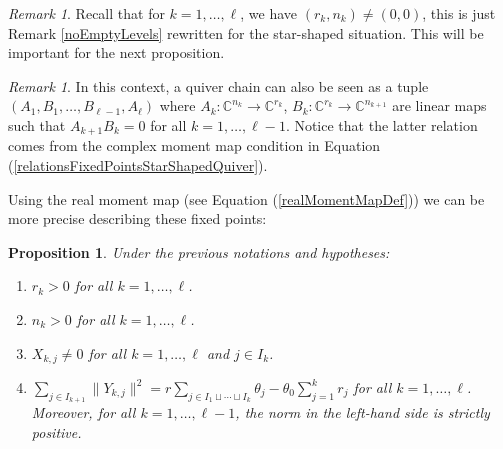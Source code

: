 \documentclass{amsart}
\theoremstyle{plain}
\newtheorem{proposition}[theorem]{Proposition}
\numberwithin{equation}{section}
\theoremstyle{definition}
\theoremstyle{remark}
\newtheorem{remark}[theorem]{Remark}
\begin{document}
	\begin{remark}
	Recall that for $k=1,\ldots,\ell$, we have $(r_k,n_k)\neq(0,0)$, this is just Remark \ref{noEmptyLevels} rewritten for the star-shaped situation. This will be important for the next proposition. 
	\end{remark}
	\begin{remark}\label{anotherPointOfViewStarShapedChains}
		In this context, a quiver chain can also be seen as a tuple $(A_1,B_1,\ldots ,B_{\ell-1},A_\ell)$ where $A_k:\mathbb{C}^{n_k}\to \mathbb{C}^{r_k}$, $B_{k}:\mathbb{C}^{r_{k}}\to \mathbb{C}^{n_{k+1}}$ are linear maps such that $A_{k+1}B_k=0$ for all $k=1,\ldots,\ell-1$. Notice that the latter relation comes from the complex moment map condition in Equation (\ref{relationsFixedPointsStarShapedQuiver}).
	\end{remark}
	Using the real moment map (see Equation (\ref{realMomentMapDef})) we can be more precise describing these fixed points:
	\begin{proposition}\label{propertiesFixedPointsStarShapedQuiver}
		Under the previous notations and hypotheses:
		\begin{enumerate}
			\item $r_k>0$ for all $k=1,\ldots,\ell$.
			\item $n_k>0$ for all $k=1,\ldots,\ell$.
			\item $X_{k,j}\neq 0$  for all $k=1,\ldots,\ell$ and $j\in I_k$.
			\item $\sum_{j\in I_{k+1}}\|Y_{k,j}\|^2=r\sum_{j\in I_1\sqcup\cdots\sqcup I_k}\theta_j-\theta_0\sum_{j=1}^{k}r_j$ for all $k=1,\ldots,\ell$. Moreover, for all $k=1,\ldots,\ell-1$, the norm in the left-hand side is strictly positive. 
		\end{enumerate}
	\end{proposition}
\end{document}
